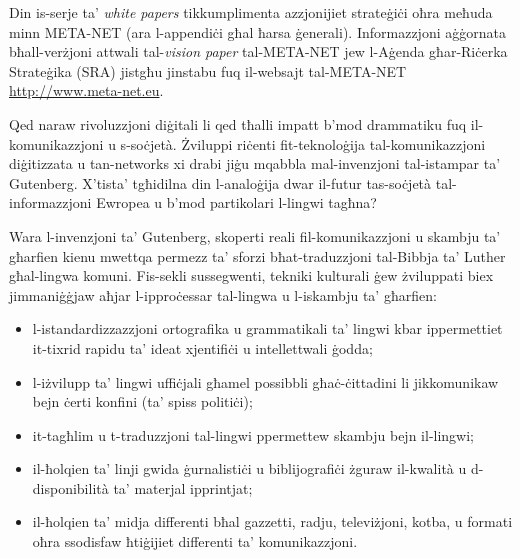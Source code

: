 \documentclass[]{../../metanetpaper}
\begin{document}
\begin{multicols}{2}
Din is-serje ta’ \emph{white papers} tikkumplimenta azzjonijiet strateġiċi oħra meħuda minn META-NET (ara l-appendiċi għal ħarsa ġenerali). Informazzjoni aġġornata bħall-verżjoni attwali tal-\emph{vision paper}\cite{Meta1}  tal-META-NET jew l-Aġenda għar-Riċerka Strateġika (SRA) jistgħu jinstabu fuq il-websajt tal-META-NET \url{http://www.meta-net.eu}.
\end{multicols}

\clearpage



\begin{multicols}{2}

Qed naraw rivoluzzjoni diġitali li qed tħalli impatt b’mod drammatiku fuq il-komunikazzjoni u s-soċjetà. Żviluppi riċenti fit-teknoloġija tal-komunikazzjoni diġitizzata u tan-networks xi drabi jiġu mqabbla mal-invenzjoni tal-istampar ta’ Gutenberg. X’tista’ tgħidilna din l-analoġija dwar il-futur tas-soċjetà tal-informazzjoni Ewropea u b’mod partikolari l-lingwi tagħna?
   
Wara l-invenzjoni ta’ Gutenberg, skoperti reali fil-komunikazzjoni u skambju ta’ għarfien kienu mwettqa permezz ta’ sforzi bħat-traduzzjoni tal-Bibbja ta’ Luther għal-lingwa komuni. Fis-sekli sussegwenti, tekniki kulturali ġew żviluppati biex jimmaniġġjaw aħjar l-ipproċessar tal-lingwa u l-iskambju ta’ għarfien:

\begin{itemize}
\item l-istandardizzazzjoni ortografika u grammatikali ta’ lingwi kbar ippermettiet it-tixrid rapidu ta’ ideat xjentifiċi u intellettwali ġodda;
\item l-iżvilupp ta’ lingwi uffiċjali għamel possibbli għaċ-ċittadini li jikkomunikaw bejn ċerti konfini (ta’ spiss politiċi);
\item it-tagħlim u t-traduzzjoni tal-lingwi ppermettew skambju bejn il-lingwi;
\item il-ħolqien ta’ linji gwida ġurnalistiċi u biblijografiċi żguraw il-kwalità u d-disponibilità ta’ materjal ipprintjat;
\item il-ħolqien ta’ midja differenti bħal gazzetti, radju, televiżjoni, kotba, u formati oħra ssodisfaw ħtiġijiet differenti ta’ komunikazzjoni.
\end{itemize}


\end{multicols}
\end{document}
